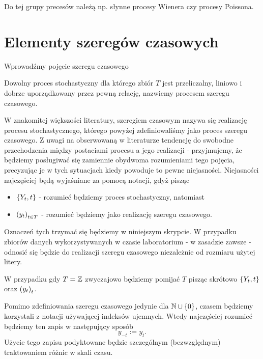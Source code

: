 \documentclass[10pt,a4paper]{book}
\begin{document}
Do tej grupy precesów należą np. słynne procesy Wienera czy procesy Poissona.

\section{Elementy szeregów czasowych}

Wprowadźmy pojęcie szeregu czasowego 

\begin{definition}
Dowolny proces stochastyczny dla którego zbiór $T$ jest przeliczalny, liniowo i dobrze uporządkowany przez pewną relację, nazwiemy procesem szeregu czasowego.
\end{definition}

\begin{remark}
W znakomitej większości literatury, szeregiem czasowym nazywa się realizację procesu stochastycznego, którego powyżej zdefiniowaliśmy jako proces szeregu czasowego. Z uwagi na obserwowaną w literaturze tendencję do swobodne przechodzenia między postaciami procesu a jego realizacji - przyjmujemy, że będziemy posługiwać się zamiennie obydwoma rozumieniami tego pojęcia, precyzując je w tych sytuacjach kiedy powoduje to pewne niejasności. Niejasności najczęściej będą wyjaśniane za pomocą notacji, gdyż pisząc
\begin{itemize}
\item $\left\lbrace {{Y_t}, {t}} \right\rbrace$ - rozumieć będziemy proces stochastyczny, natomiast
\item $\left( {y_t} \right)_{t \in T}^{}$ - rozumieć będziemy jako realizację szeregu czasowego.
\end{itemize}
Oznaczeń tych trzymać się będziemy w niniejszym skrypcie. W przypadku zbiorów danych wykorzystywanych w czasie laboratorium - w zasadzie zawsze - odnosić się będzie do realizacji szeregu czasowego niezależnie od rozmiaru użytej litery.
\end{remark}

\begin{remark}
W przypadku gdy $T = \mathbb{Z} $ zwyczajowo będziemy pomijać $T$ pisząc skrótowo $\left\lbrace {{Y_t}, {t}} \right\rbrace$ oraz $\left({y_t}\right)_{t}$.
\end{remark}

\begin{remark}
Pomimo zdefiniowania szeregu czasowego jedynie dla $\mathbb{N} \cup \left\lbrace {0} \right\rbrace $, czasem będziemy korzystali z notacji używającej indeksów ujemnych. Wtedy najczęściej rozumieć będziemy ten zapis w następujący sposób
$$
y_{-t} := y_{t}.
$$
Użycie tego zapisu podyktowane będzie szczególnym (bezwzględnym) traktowaniem różnic w skali czasu.
\end{remark}
\end{document}

